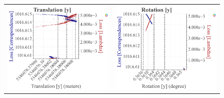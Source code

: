 \begin{figure}[t]
\begin{tabular}{cc}
    \includegraphics[width=0.45 \linewidth]{diagrams/calibration/s40_n_far_small/parameters_all.csv/Translation[y]_vs_Loss[Correspondences]_vs_Loss[Lambdas]_cluster_All.png} &
    \includegraphics[width=0.45 \linewidth]{diagrams/calibration/s40_n_far_small/parameters_all.csv/Rotation[y]_vs_Loss[Correspondences]_vs_Loss[Lambdas]_cluster_All.png} \\
    

\end{tabular}
\end{figure}
